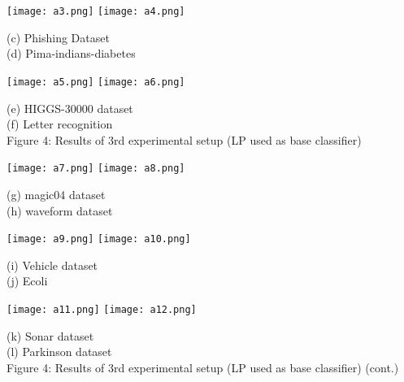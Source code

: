 \documentclass{article}
\begin{document}
		  \vspace{0.9em}
		  \texttt{[image: a3.png]}
		  \texttt{[image: a4.png]}
		  \begin{center}
		  	\small (c) Phishing Dataset\\
		  	\vspace{0.5em}(d) Pima-indians-diabetes
		  \end{center}
		  
		  \vspace{0.9em}
		  \texttt{[image: a5.png]}
		  \texttt{[image: a6.png]}
		  \begin{center}
		  	\small (e) HIGGS-30000 dataset\\
		  	\vspace{0.5em}(f) Letter recognition\\
		  	\vspace{0.9em}
		  	Figure 4: Results of 3rd experimental setup (LP used as base classifier)
		  \end{center}
		  
		  
		    \newpage
		  \texttt{[image: a7.png]}
		  \texttt{[image: a8.png]}
		  \begin{center}
		  	\small (g) magic04 dataset \\
		  	\vspace{0.5em}(h) waveform dataset
		  \end{center}
		  
		  \vspace{0.9em}
		  \texttt{[image: a9.png]}
		  \texttt{[image: a10.png]}
		  \begin{center}
		  	\small (i) Vehicle dataset \\
		  	\vspace{0.5em}(j) Ecoli
		  \end{center}
		  
		  \vspace{0.9em}
		  \texttt{[image: a11.png]}
		  \texttt{[image: a12.png]}
		  \begin{center}
		  	\small (k) Sonar dataset\\
		  	\vspace{0.5em}(l) Parkinson dataset \\
		  	\vspace{0.9em}
		  	Figure 4: Results of 3rd experimental setup (LP used as base classifier) (cont.)
		  \end{center}
		  
\end{document}
